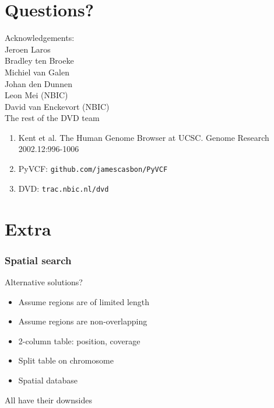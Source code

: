 \documentclass[slidestop]{beamer}
\begin{document}
\section{Questions?}
\lastpagetemplate
\begin{frame}
  \begin{center}
    Acknowledgements:\\
    \vspace{0.8cm}
    Jeroen Laros\\
    Bradley ten Broeke\\
    Michiel van Galen\\
    Johan den Dunnen\\
    \vspace{0.8cm}
    Leon Mei (NBIC)\\
    David van Enckevort (NBIC)\\
    The rest of the DVD team
  \end{center}
  \vspace{1cm}
  {\tiny
    \begin{enumerate}
      \item Kent et al. The Human Genome Browser at UCSC. Genome Research 2002.12:996-1006
      \item PyVCF: \texttt{github.com/jamescasbon/PyVCF}
      \item DVD: \texttt{trac.nbic.nl/dvd}
    \end{enumerate}
  }
\end{frame}

\section{Extra}
\extrapagetemplate
\begin{frame}
  \frametitle{Spatial search}
  Alternative solutions?
  \begin{itemize}
    \item Assume regions are of limited length
    \item Assume regions are non-overlapping
    \item 2-column table: position, coverage
    \item Split table on chromosome
    \item Spatial database
  \end{itemize}
  \vspace{1cm}
  All have their downsides
\end{frame}
\end{document}
